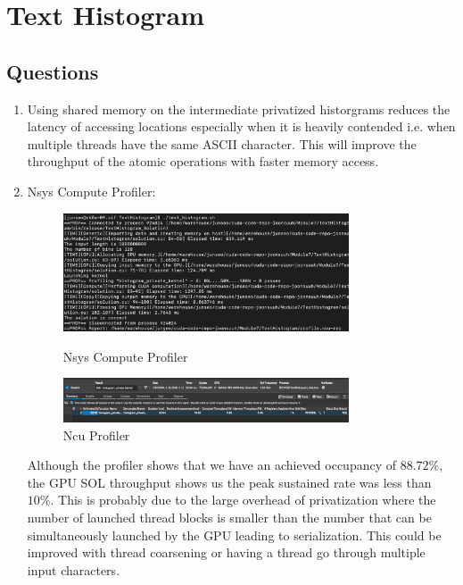 \documentclass[../main.tex]{subfiles}
\begin{document}
\pagestyle{fancy}


\renewcommand{\thefigure}{\arabic{figure}}
\section*{Text Histogram}

\subsection*{Questions}

\begin{enumerate}
    \item Using shared memory on the intermediate privatized historgrams reduces the latency of 
    accessing locations especially when it is heavily contended i.e. when multiple threads have
    the same ASCII character. This will improve the throughput of the atomic operations with faster
    memory access. 

    \item Nsys Compute Profiler:
    \begin{figure}[ht]
        \centering
        \includegraphics[width=0.8\textwidth]{texthistogram-prof.png}
        \caption{Nsys Compute Profiler}
        \label{fig:texthistogram-prof}
        \includegraphics[width=0.8\textwidth]{histogram-ncu.png}
        \caption{Ncu Profiler}
        \label{fig:histogram-ncu}
    \end{figure}
    Although the profiler shows that we have an achieved occupancy of $88.72\%$, the GPU SOL
    throughput shows us the peak sustained rate was less than $10\%$. This is probably due to the
    large overhead of privatization where the number of launched thread blocks is smaller than the
    number that can be simultaneously launched by the GPU leading to serialization. This could
    be improved with thread coarsening or having a thread go through multiple input characters.


\end{enumerate}
\end{document}
